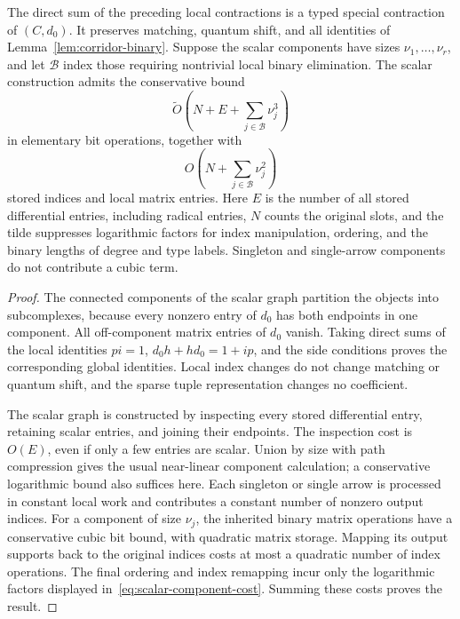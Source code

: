 \begin{theorem}
\label{thm:scalar-component-contraction}
The direct sum of the preceding local contractions is a typed special
contraction of $(C,d_0)$.  It preserves matching, quantum shift, and all
identities of Lemma~\ref{lem:corridor-binary}.  Suppose the scalar components
have sizes $\nu_1,\ldots,\nu_r$, and let $\mathcal B$ index those requiring
nontrivial local binary elimination.  The scalar construction admits the
conservative bound
\begin{equation}\label{eq:scalar-component-cost}
 \widetilde O\!\left(N+E+\sum_{j\in\mathcal B}\nu_j^3\right)
\end{equation}
in elementary bit operations, together with
\begin{equation}\label{eq:scalar-component-storage}
 O\!\left(N+\sum_{j\in\mathcal B}\nu_j^2\right)
\end{equation}
stored indices and local matrix entries.  Here $E$ is the number of all
stored differential entries, including radical entries, $N$ counts the original
slots, and the tilde suppresses logarithmic
factors for index manipulation, ordering, and the binary lengths of degree
and type labels.  Singleton and single-arrow components do not contribute a
cubic term.
\end{theorem}

\begin{proof}
The connected components of the scalar graph partition the objects into
subcomplexes, because every nonzero entry of $d_0$ has both endpoints in one
component.  All off-component matrix entries of $d_0$ vanish.  Taking direct
sums of the local identities $pi=1$, $d_0h+hd_0=1+ip$, and the side
conditions proves the corresponding global identities.  Local index changes
do not change matching or quantum shift, and the sparse tuple representation
changes no coefficient.

The scalar graph is constructed by inspecting every stored differential
entry, retaining scalar entries, and joining their endpoints.  The inspection
cost is $O(E)$, even if only a few entries are scalar.  Union by size with
path compression gives the usual
near-linear component calculation; a conservative logarithmic bound also
suffices here.  Each singleton or single arrow is processed in constant
local work and contributes a constant number of nonzero output indices.
For a component of size $\nu_j$, the inherited binary matrix operations have
a conservative cubic bit bound, with quadratic matrix storage.  Mapping
its output supports back to the original indices costs at most a quadratic
number of index operations.  The final ordering and index remapping incur
only the logarithmic factors displayed in~\eqref{eq:scalar-component-cost}.
Summing these costs proves the result.
\end{proof}

